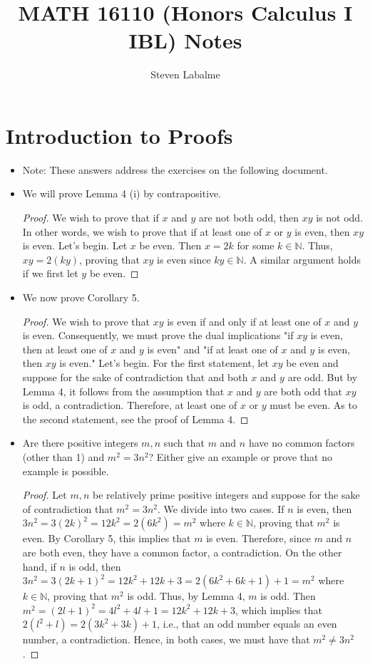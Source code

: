 \documentclass[titlepage]{article}
\title{MATH 16110 (Honors Calculus I IBL) Notes}
\author{Steven Labalme}
\newcommand{\N}{\mathbb{N}}
\begin{document}
\maketitle



\tableofcontents
\newpage



\pagestyle{main}
\renewcommand{\sectionmark}[1]{\markboth{#1}{}}
\section{Introduction to Proofs}
\begin{itemize}
    \item {}Note: These answers address the exercises on the following document.
    \item We will prove Lemma 4 (i) by contrapositive.
    \begin{proof}
        We wish to prove that if $x$ and $y$ are not both odd, then $xy$ is not odd. In other words, we wish to prove that if at least one of $x$ or $y$ is even, then $xy$ is even. Let's begin. Let $x$ be even. Then $x=2k$ for some $k\in\N$. Thus, $xy=2(ky)$, proving that $xy$ is even since $ky\in\N$. A similar argument holds if we first let $y$ be even.
    \end{proof}
    \item We now prove Corollary 5.
    \begin{proof}
        We wish to prove that $xy$ is even if and only if at least one of $x$ and $y$ is even. Consequently, we must prove the dual implications "if $xy$ is even, then at least one of $x$ and $y$ is even" and "if at least one of $x$ and $y$ is even, then $xy$ is even." Let's begin. For the first statement, let $xy$ be even and suppose for the sake of contradiction that and both $x$ and $y$ are odd. But by Lemma 4, it follows from the assumption that $x$ and $y$ are both odd that $xy$ is odd, a contradiction. Therefore, at least one of $x$ or $y$ must be even. As to the second statement, see the proof of Lemma 4.
    \end{proof}
    \item Are there positive integers $m,n$ such that $m$ and $n$ have no common factors (other than 1) and $m^2=3n^2$? Either give an example or prove that no example is possible.
    \begin{proof}
        Let $m,n$ be relatively prime positive integers and suppose for the sake of contradiction that $m^2=3n^2$. We divide into two cases. If $n$ is even, then $3n^2=3(2k)^2=12k^2=2(6k^2)=m^2$ where $k\in\N$, proving that $m^2$ is even. By Corollary 5, this implies that $m$ is even. Therefore, since $m$ and $n$ are both even, they have a common factor, a contradiction. On the other hand, if $n$ is odd, then $3n^2=3(2k+1)^2=12k^2+12k+3=2(6k^2+6k+1)+1=m^2$ where $k\in\N$, proving that $m^2$ is odd. Thus, by Lemma 4, $m$ is odd. Then $m^2=(2l+1)^2=4l^2+4l+1=12k^2+12k+3$, which implies that $2(l^2+l)=2(3k^2+3k)+1$, i.e., that an odd number equals an even number, a contradiction. Hence, in both cases, we must have that $m^2\neq 3n^2$.

\end{proof}
\end{itemize}
\end{document}
